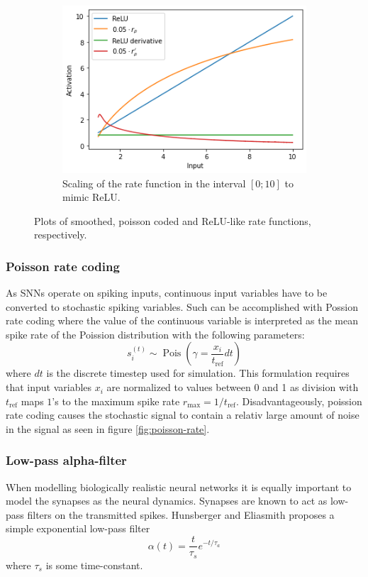 \documentclass[a4paper,11pt]{article} %
\DeclareMathOperator{\Pois}{Pois}
\begin{document}
\begin{figure}
\begin{subfigure}[t]{0.32\textwidth}
    \includegraphics[width=\textwidth]{graphics/rate-scaling.png}
    \caption{Scaling of the rate function in the interval $[0; 10]$ to mimic ReLU.}
    \label{fig:rate-scaling}
  \end{subfigure}
  \caption{Plots of smoothed, poisson coded and ReLU-like rate functions, respectively.}
\end{figure}



\subsubsection{Poisson rate coding}
As SNNs operate on spiking inputs, continuous input variables have to be converted to stochastic spiking variables. Such can be accomplished with Possion rate coding where the value of the continuous variable is interpreted as the mean spike rate of the Poission distribution with the following parameters:
\begin{equation}
  s_i^{(t)} \sim \Pois \left( \gamma = \frac{x_i}{t_\text{ref}} dt \right)
\end{equation}
where $dt$ is the discrete timestep used for simulation. This formulation requires that input variables $x_i$ are normalized to values between 0 and 1 as division with $t_\text{ref}$ maps $1$'s to the maximum spike rate $r_\text{max} = 1 / t_\text{ref}$. Disadvantageously, poission rate coding causes the stochastic signal to contain a relativ large amount of noise in the signal as seen in figure \ref{fig:poisson-rate}.


\subsubsection{Low-pass alpha-filter}
When modelling biologically realistic neural networks it is equally important to model the synapses as the neural dynamics. Synapses are known to act as low-pass filters on the transmitted spikes. Hunsberger and Eliasmith \cite{hunsberger2015spiking} proposes a simple exponential low-pass filter
\begin{equation} \label{eq:alpha-filter}
  \alpha(t) = \frac{t}{\tau_{s}} e^{-t / \tau_{a}}
\end{equation}
where $\tau_s$ is some time-constant. 
\end{document}
